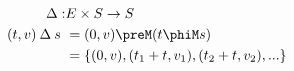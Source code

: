 \documentclass[preview]{standalone}
\begin{document}
\begin{align*}
    \fdelay : & E  \times S \rightarrow S\\
    (t,v) \fdelay s\ & = (0,v) \preM (t \phiM s)\\
    &=\{(0,v),(t_1+t,v_1),(t_2+t,v_2),...\}\nonumber
\end{align*}
\end{document}
